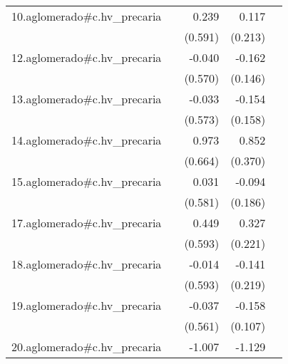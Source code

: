 {\begin{longtable}{l*{4}{D{.}{.}{-1}}}
\addlinespace
10.aglomerado#c.hv\_precaria&                     &       0.239         &       0.117         &                     \\
            &                     &     (0.591)         &     (0.213)         &                     \\
\addlinespace
12.aglomerado#c.hv\_precaria&                     &      -0.040         &      -0.162         &                     \\
            &                     &     (0.570)         &     (0.146)         &                     \\
\addlinespace
13.aglomerado#c.hv\_precaria&                     &      -0.033         &      -0.154         &                     \\
            &                     &     (0.573)         &     (0.158)         &                     \\
\addlinespace
14.aglomerado#c.hv\_precaria&                     &       0.973         &       0.852\sym{*}  &                     \\
            &                     &     (0.664)         &     (0.370)         &                     \\
\addlinespace
15.aglomerado#c.hv\_precaria&                     &       0.031         &      -0.094         &                     \\
            &                     &     (0.581)         &     (0.186)         &                     \\
\addlinespace
17.aglomerado#c.hv\_precaria&                     &       0.449         &       0.327         &                     \\
            &                     &     (0.593)         &     (0.221)         &                     \\
\addlinespace
18.aglomerado#c.hv\_precaria&                     &      -0.014         &      -0.141         &                     \\
            &                     &     (0.593)         &     (0.219)         &                     \\
\addlinespace
19.aglomerado#c.hv\_precaria&                     &      -0.037         &      -0.158         &                     \\
            &                     &     (0.561)         &     (0.107)         &                     \\
\addlinespace
20.aglomerado#c.hv\_precaria&                     &      -1.007         &      -1.129\sym{**} &                     \\

\end{longtable}}

